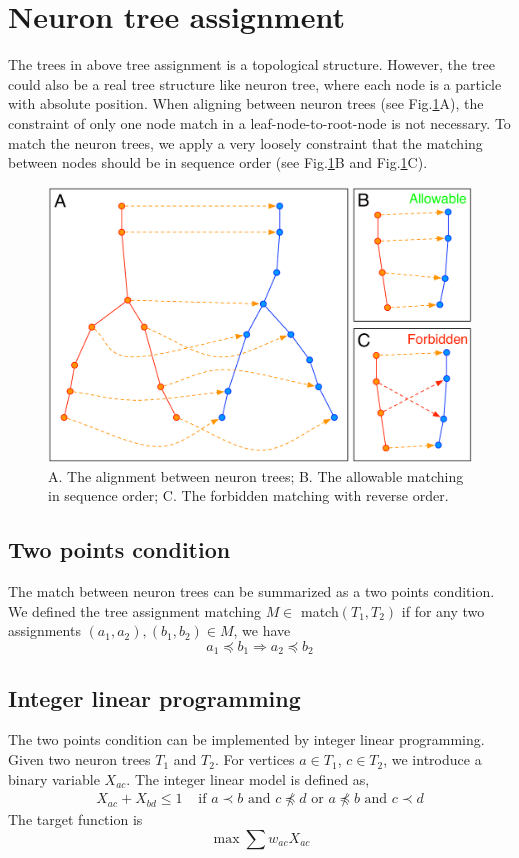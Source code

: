 \section{Neuron tree assignment}
The trees in above tree assignment is a topological structure. However, the tree could also be a real tree structure like neuron tree, where each node is a particle with absolute position. When aligning between neuron trees (see Fig.\ref{fig:treeassign-nt}A), the constraint of only one node match in a leaf-node-to-root-node is not necessary. To match the neuron trees, we apply a very loosely constraint that the matching between nodes should be in sequence order (see Fig.\ref{fig:treeassign-nt}B and Fig.\ref{fig:treeassign-nt}C). 

\begin{figure}[htbp]
\centering
\includegraphics[width=1.0\textwidth]{images/treeassign_nt}
\caption[The alignment between neuron trees]{A. The alignment between neuron trees; B. The allowable matching in sequence order; C. The forbidden matching with reverse order.}
\label{fig:treeassign-nt}
\end{figure}

\subsection{Two points condition}
The match between neuron trees can be summarized as a two points condition. We defined the tree assignment matching $M \in$ match$(T_1,T_2)$ if for any two assignments $(a_1,a_2),(b_1,b_2) \in M$, we have
$$
a_1 \preceq b_1 \Rightarrow a_2 \preceq b_2
$$

\subsection{Integer linear programming}
The two points condition can be implemented by integer linear programming. Given two neuron trees $T_1$ and $T_2$. For vertices $a\in T_1$, $c\in T_2$, we introduce a binary variable $X_{ac}$. The integer linear model is defined as,
\begin{eqnarray}
X_{ac} + X_{bd} \le 1  & \mbox{ if } a \prec b \mbox{ and } c \not\preceq d \mbox{ or } a \not\preceq b \mbox{ and } c \prec d
\end{eqnarray}
The target function is
$$
\max\sum w_{ac} X_{ac}
$$
